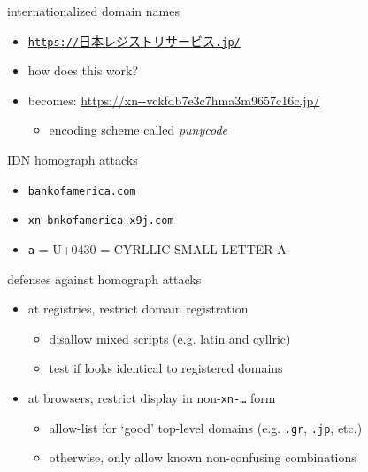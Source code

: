 \begin{frame}{internationalized domain names}
    \begin{itemize}
    \item \href{https://日本レジストリサービス.jp}{\texttt{https://}{日本レジストリサービス}\texttt{.jp/}}
    \item how does this work?
    \vspace{.5cm}
    \item becomes: \url{https://xn--vckfdb7e3c7hma3m9657c16c.jp/}
        \begin{itemize}
        \item encoding scheme called \textit{punycode}
        \end{itemize}
    \end{itemize}
\end{frame}

\begin{frame}{IDN homograph attacks}
    \begin{itemize}
    \item \texttt{bаnkofamerica.com}
    \item \texttt{xn--bnkofamerica-x9j.com}
    \item \texttt{а} = U+0430 = CYRLLIC SMALL LETTER A
    \end{itemize}
\end{frame}

\begin{frame}{defenses against homograph attacks}
    \begin{itemize}
    \item at registries, restrict domain registration
        \begin{itemize}
        \item disallow mixed scripts (e.g. latin and cyllric)
        \item test if looks identical to registered domains
        \end{itemize}
    \item at browsers, restrict display in non-\texttt{xn-\ldots} form
        \begin{itemize}
        \item allow-list for `good' top-level domains (e.g. \texttt{.gr}, \texttt{.jp}, etc.)
        \item otherwise, only allow known non-confusing combinations
        \end{itemize}
    \end{itemize}
\end{frame}
